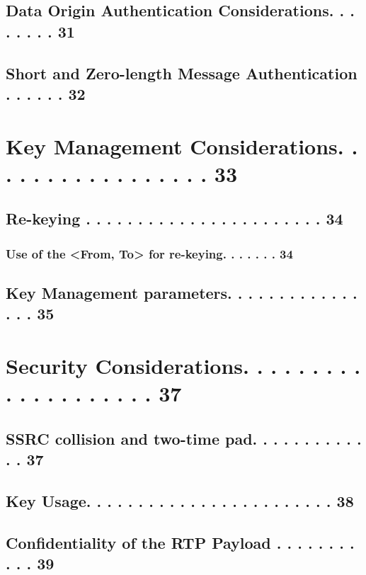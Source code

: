 \documentclass{article}
\begin{document}
\subsection{Data Origin Authentication Considerations. . . . . . . . 31}

\subsection{Short and Zero-length Message Authentication . . . . . . 32}

\section{Key Management Considerations. . . . . . . . . . . . . . . . . 33}

\subsection{Re-keying  . . . . . . . . . . . . . . . . . . . . . . . 34}

\subsubsection{Use of the <From, To> for re-keying. . . . . . . 34}

\subsection{Key Management parameters. . . . . . . . . . . . . . . . 35}

\section{Security Considerations. . . . . . . . . . . . . . . . . . . . 37}

\subsection{SSRC collision and two-time pad. . . . . . . . . . . . . 37}

\subsection{Key Usage. . . . . . . . . . . . . . . . . . . . . . . . 38}

\subsection{Confidentiality of the RTP Payload . . . . . . . . . . . 39}
\end{document}
